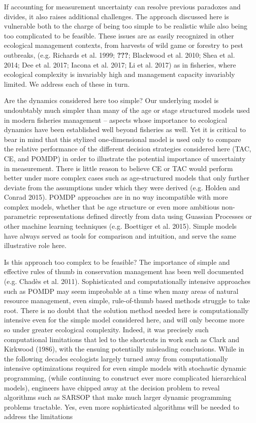 \documentclass[3p]{elsarticle} %
\begin{document}
If accounting for measurement uncertainty can resolve previous paradoxes
and divides, it also raises additional challenges. The approach
discussed here is vulnerable both to the charge of being too simple to
be realistic while also being too complicated to be feasible. These
issues are as easily recognized in other ecological management contexts,
from harvests of wild game or forestry to pest outbreaks, (e.g. Richards
et al. 1999; {\textbf{???}}; Blackwood et al. 2010; Shea et al. 2014;
Dee et al. 2017; Iacona et al. 2017; Li et al. 2017) as in fisheries,
where ecological complexity is invariably high and management capacity
invariably limited. We address each of these in turn.

Are the dynamics considered here too simple? Our underlying model is
undoubtably much simpler than many of the age or stage structured models
used in modern fisheries management -- aspects whose importance to
ecological dynamics have been established well beyond fisheries as well.
Yet it is critical to bear in mind that this stylized one-dimensional
model is used only to compare the relative performance of the different
decision strategies considered here (TAC, CE, and POMDP) in order to
illustrate the potential importance of uncertainty in measurement. There
is little reason to believe CE or TAC would perform better under more
complex cases such as age-structured models that only further deviate
from the assumptions under which they were derived (e.g. Holden and
Conrad 2015). POMDP approaches are in no way incompatible with more
complex models, whether that be age structure or even more ambitious
non-parametric representations defined directly from data using Guassian
Processes or other machine learning techniques (e.g. Boettiger et al.
2015). Simple models have always served as tools for comparison and
intuition, and serve the same illustrative role here.

Is this approach too complex to be feasible? The importance of simple
and effective rules of thumb in conservation management has been well
documented (e.g. Chadès et al. 2011). Sophisticated and computationally
intensive approaches such as POMDP may seem improbable at a time when
many areas of natural resource management, even simple, rule-of-thumb
based methods struggle to take root. There is no doubt that the solution
method needed here is computationally intensive even for the simple
model considered here, and will only become more so under greater
ecological complexity. Indeed, it was precisely such computational
limitations that led to the shortcuts in work such as Clark and Kirkwood
(1986), with the ensuing potentially misleading conclusions. While in
the following decades ecologists largely turned away from
computationally intensive optimizations required for even simple models
with stochastic dynamic programming, (while continuing to construct ever
more complicated hierarchical models), engineers have chipped away at
the decision problem to reveal algorithms such as SARSOP that make much
larger dynamic programming problems tractable. Yes, even more
sophisticated algorithms will be needed to address the limitations
\end{document}
